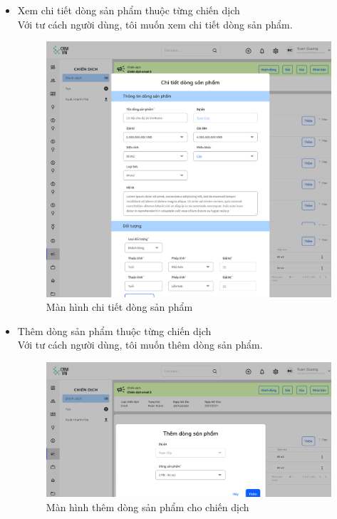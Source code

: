 \documentclass[12pt,a4paper]{article}
\begin{document}
\begin{enumerate}
\begin{itemize}
            \item Xem chi tiết dòng sản phẩm thuộc từng chiến dịch\\
            Với tư cách người dùng, tôi muốn xem chi tiết dòng sản phẩm.

            \begin{figure}[H]
                \centering \includegraphics[width=\textwidth]{Img/Nguyet/Chiendich/chitietdongsp.png}
                \vspace{0.5cm}
                \caption{Màn hình chi tiết dòng sản phẩm }
                \label{chitietdspchiendich}
            \end{figure}

            \item Thêm dòng sản phẩm thuộc từng chiến dịch \\
            Với tư cách người dùng, tôi muốn thêm dòng sản phẩm.

            \begin{figure}[H]
                \centering \includegraphics[width=\textwidth]{Img/Nguyet/Chiendich/themdongsp.png}
                \vspace{0.5cm}
                \caption{Màn hình thêm dòng sản phẩm cho chiến dịch }
                \label{themdspchiendich}
            \end{figure}


\end{itemize}
\end{enumerate}
\end{document}
